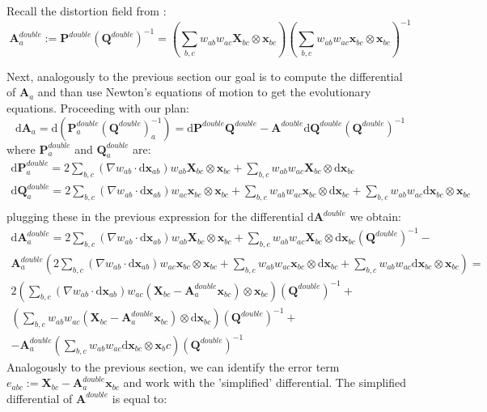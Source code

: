 \documentclass[oneside, a4paper, onecolumn, 11pt]{article}
\renewcommand{\AA}{\mathbf{A}}
\newcommand{\xx}{\mathbf{x}}
\newcommand{\XX}{\mathbf{X}}
\newcommand{\diff}{\mathrm{d}}
\newcommand{\Ad}{\mathbf{A}^{double}}
\newcommand{\Qd}{\mathbf{Q}^{double}}
\newcommand{\invQd}{\left(\mathbf{Q}^{double}\right)^{-1}}
\newcommand{\Pd}{\mathbf{P}^{double}}
\newcommand{\dxx}{\text{d}\mathbf{x}}
\begin{document}
\begin{section}
\begin{subsection}
\begin{subsubsection}
Recall the distortion field from \cite{hutter-pavelka}:
\[
    \Ad_{a} := \Pd \invQd = \left( \sum_{b,c} w_{ab} w_{ac} \XX_{bc} \otimes \xx_{bc} \right) 
    \left( \sum_{b,c} w_{ab} w_{ac} \xx_{bc} \otimes \xx_{bc} \right)^{-1}
\]

Next, analogously to the previous section our goal is to compute the differential of $\AA_a$
and than use Newton's equations of motion to get the evolutionary equations. Proceeding
with our plan:
\[
    \diff \AA_{a} = \diff \left( \Pd_{a} \invQd_{a} \right) = \diff \Pd \Qd -
    \Ad \diff \Qd \invQd
\]
where $\Pd_{a}$ and $\Qd_a$ are:
\[
    \begin{aligned}
        \diff \Pd_{a} = 2 \sum_{b,c} \left( \nabla w_{ab} \cdot \dxx_{ab} \right) 
        w_{ab} \XX_{bc} \otimes \xx_{bc} + 
        \sum_{b,c} w_{ab} w_{ac} \XX_{bc} \otimes \dxx_{bc}\\
        \diff \Qd_{a} = 2 \sum_{b,c} \left( \nabla w_{ab} \cdot \dxx_{ab} \right) 
        w_{ac} \xx_{bc} \otimes \xx_{bc} + 
        \sum_{b,c} w_{ab} w_{ac} \xx_{bc} \otimes \dxx_{bc} + 
        \sum_{b,c} w_{ab} w_{ac} \dxx_{bc} \otimes \xx_{bc}\\
    \end{aligned}
\]
plugging these in the previous expression for the differential $\diff \Ad$ we obtain: 
\[
    \begin{aligned}
        \diff \Ad_{a} = 2 \sum_{b,c} \left( \nabla w_{ab} \cdot \dxx_{ab} \right) 
        w_{ab} \XX_{bc} \otimes \xx_{bc} + 
        \sum_{b,c} w_{ab} w_{ac} \XX_{bc} \otimes \dxx_{bc} \invQd -\\
        \Ad_{a} \left( 2 \sum_{b,c} \left( \nabla w_{ab} \cdot \dxx_{ab} \right) 
        w_{ac} \xx_{bc} \otimes \xx_{bc} + 
        \sum_{b,c} w_{ab} w_{ac} \xx_{bc} \otimes \dxx_{bc} + 
        \sum_{b,c} w_{ab} w_{ac} \dxx_{bc} \otimes \xx_{bc} \right) =\\
        2 \left( \sum_{b,c} \left( \nabla w_{ab} \cdot \dxx_{ab} \right) 
        w_{ac} \left( \XX_{bc} - \Ad_{a} \xx_{bc} \right) \otimes
        \xx_{bc}\right) \invQd + \\
        \left( \sum_{b,c} w_{ab} w_{ac} 
        \left( \XX_{bc} - \Ad_{a} \xx_{bc} \right) \otimes
        \dxx_{bc}\right) \invQd + \\
        - \Ad_{a} \left( \sum_{b,c} w_{ab} w_{ac} \dxx_{bc} \otimes \xx_bc \right) \invQd
    \end{aligned}
\]
Analogously to the previous section, we can identify the error term 
$e_{abc} := \XX_{bc} - \Ad_{a} \xx_{bc}$ and work with the 'simplified'
differential.
The simplified differential of $\Ad$ is equal to:


\end{subsubsection}
\end{subsection}
\end{section}
\end{document}
